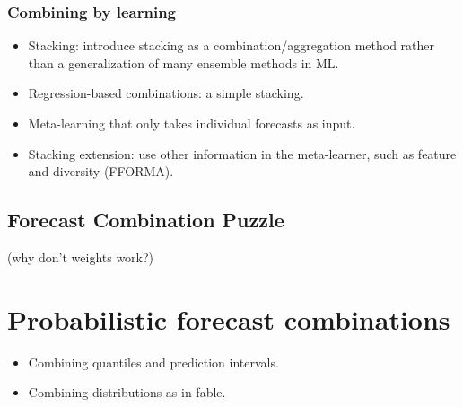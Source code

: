 \documentclass[11pt]{article}
\begin{document}
\subsubsection{Combining by learning}
\begin{itemize}
 \item Stacking: introduce stacking as a combination/aggregation method rather than a generalization of many ensemble methods in ML.
 \item Regression-based combinations: a simple stacking.
 \item Meta-learning that only takes individual forecasts as input.
 \item Stacking extension: use other information in the meta-learner, such as feature and diversity (FFORMA).
\end{itemize}

\subsection{Forecast Combination Puzzle}
{\color{red} (why don't weights work?)}

\citep{De_Menezes2000-vd,Genre2013-ut,Post2019-lv,Chan2018-jl,Lichtendahl2020-ut,Kourentzes2019-na}


\section{Probabilistic forecast combinations}
\begin{itemize}
\item Combining quantiles and prediction intervals.
\item Combining distributions as in fable.
\end{itemize}
\end{document}
